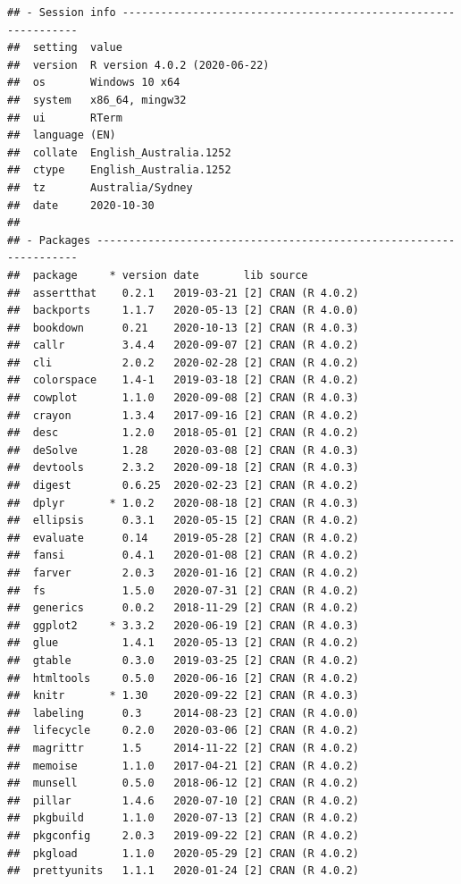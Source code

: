 \documentclass[]{elsarticle} %
\begin{document}
\begin{verbatim}
## - Session info ---------------------------------------------------------------
##  setting  value                       
##  version  R version 4.0.2 (2020-06-22)
##  os       Windows 10 x64              
##  system   x86_64, mingw32             
##  ui       RTerm                       
##  language (EN)                        
##  collate  English_Australia.1252      
##  ctype    English_Australia.1252      
##  tz       Australia/Sydney            
##  date     2020-10-30                  
## 
## - Packages -------------------------------------------------------------------
##  package     * version date       lib source        
##  assertthat    0.2.1   2019-03-21 [2] CRAN (R 4.0.2)
##  backports     1.1.7   2020-05-13 [2] CRAN (R 4.0.0)
##  bookdown      0.21    2020-10-13 [2] CRAN (R 4.0.3)
##  callr         3.4.4   2020-09-07 [2] CRAN (R 4.0.2)
##  cli           2.0.2   2020-02-28 [2] CRAN (R 4.0.2)
##  colorspace    1.4-1   2019-03-18 [2] CRAN (R 4.0.2)
##  cowplot       1.1.0   2020-09-08 [2] CRAN (R 4.0.3)
##  crayon        1.3.4   2017-09-16 [2] CRAN (R 4.0.2)
##  desc          1.2.0   2018-05-01 [2] CRAN (R 4.0.2)
##  deSolve       1.28    2020-03-08 [2] CRAN (R 4.0.3)
##  devtools      2.3.2   2020-09-18 [2] CRAN (R 4.0.3)
##  digest        0.6.25  2020-02-23 [2] CRAN (R 4.0.2)
##  dplyr       * 1.0.2   2020-08-18 [2] CRAN (R 4.0.3)
##  ellipsis      0.3.1   2020-05-15 [2] CRAN (R 4.0.2)
##  evaluate      0.14    2019-05-28 [2] CRAN (R 4.0.2)
##  fansi         0.4.1   2020-01-08 [2] CRAN (R 4.0.2)
##  farver        2.0.3   2020-01-16 [2] CRAN (R 4.0.2)
##  fs            1.5.0   2020-07-31 [2] CRAN (R 4.0.2)
##  generics      0.0.2   2018-11-29 [2] CRAN (R 4.0.2)
##  ggplot2     * 3.3.2   2020-06-19 [2] CRAN (R 4.0.3)
##  glue          1.4.1   2020-05-13 [2] CRAN (R 4.0.2)
##  gtable        0.3.0   2019-03-25 [2] CRAN (R 4.0.2)
##  htmltools     0.5.0   2020-06-16 [2] CRAN (R 4.0.2)
##  knitr       * 1.30    2020-09-22 [2] CRAN (R 4.0.3)
##  labeling      0.3     2014-08-23 [2] CRAN (R 4.0.0)
##  lifecycle     0.2.0   2020-03-06 [2] CRAN (R 4.0.2)
##  magrittr      1.5     2014-11-22 [2] CRAN (R 4.0.2)
##  memoise       1.1.0   2017-04-21 [2] CRAN (R 4.0.2)
##  munsell       0.5.0   2018-06-12 [2] CRAN (R 4.0.2)
##  pillar        1.4.6   2020-07-10 [2] CRAN (R 4.0.2)
##  pkgbuild      1.1.0   2020-07-13 [2] CRAN (R 4.0.2)
##  pkgconfig     2.0.3   2019-09-22 [2] CRAN (R 4.0.2)
##  pkgload       1.1.0   2020-05-29 [2] CRAN (R 4.0.2)
##  prettyunits   1.1.1   2020-01-24 [2] CRAN (R 4.0.2)

\end{verbatim}
\end{document}
